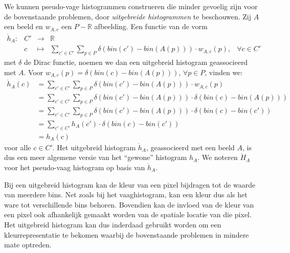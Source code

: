 We kunnen pseudo-vage histogrammen construeren die minder gevoelig zijn voor de bovenstaande problemen,
door \emph{uitgebreide histogrammen} te beschouwen. 
Zij $A$ een beeld en $w_{A,c}$ een $P - \mathbb{R}$ afbeelding. Een functie van de vorm
\begin{displaymath}
\begin{array}{rrcll}
\mathring{h}_A: 
 & C' & \to & \mathbb{R} \\
 & c  & \mapsto & \displaystyle\sum_{c' \in C'} \sum_{p \in P} \delta (bin(c')-bin(A(p))) \cdot w_{A,c}(p), & 
 \forall c \in C'
\end{array}
\end{displaymath}
met $\delta$ de Dirac functie, noemen we dan een uitgebreid histogram geassocieerd met $A$. 
Voor $w_{A,c}(p)=\delta(bin(c)-bin(A(p)))$, $\forall p \in P$, vinden we:
\begin{align*}
\mathring{h}_A(c) 
 &= \displaystyle \sum_{c' \in C'} \sum_{p \in P} \delta (bin(c')-bin(A(p))) \cdot w_{A,c}(p) \\
 &= \displaystyle \sum_{c' \in C'} \sum_{p \in P} \delta (bin(c')-bin(A(p))) \cdot \delta (bin(c)-bin(A(p))) \\
 &= \displaystyle \sum_{c' \in C'} \sum_{p \in P} \delta (bin(c')-bin(A(p))) \cdot \delta (bin(c)-bin(c')) \\
 &= \displaystyle \sum_{c' \in C'} h_A(c') \cdot \delta (bin(c)-bin(c')) \\
 &= h_A(c)
\end{align*}
voor alle $c \in C'$. Het uitgebreid histogram $\mathring{h}_A$, geassocieerd met een beeld $A$, is 
dus een meer algemene versie van het ``gewone'' histogram $h_A$. We noteren $\mathring{H}_A$ voor het 
pseudo-vaag histogram op basis van $\mathring{h}_A$.

Bij een uitgebreid histogram kan de kleur van een pixel bijdragen tot de waarde van meerdere
bins. Net zoals bij het vaaghistogram, kan een kleur dus als het ware tot verschillende 
bins behoren. Bovendien kan de invloed van de kleur van een pixel ook afhankelijk gemaakt worden
van de spatiale locatie van die pixel. Het uitgebreid histogram kan dus inderdaad gebruikt
worden om een kleurrepresentatie te bekomen waarbij de bovenstaande problemen in mindere mate
optreden.


